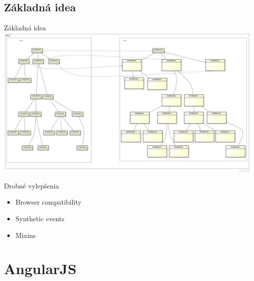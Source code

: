 \subsection{Základná idea}
\begin{frame}{Základná idea}
	\includegraphics[width=\linewidth,height=\textheight,keepaspectratio]{images/react-dom.png}
\end{frame}

\begin{frame}{Drobné vylepšenia}
	\begin{itemize}
		\item Browser compatibility
		\item Synthetic events
		\item Mixins
	\end{itemize}
\end{frame}

\section{AngularJS}
